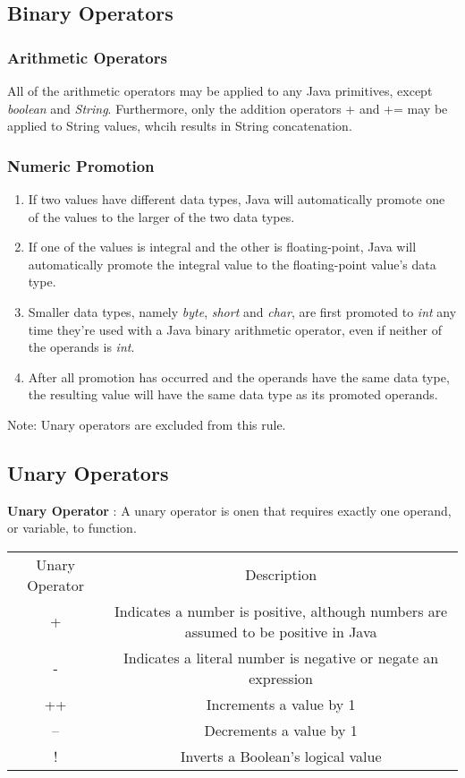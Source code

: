 \documentclass{article}
\begin{document}
\subsection{Binary Operators}
\subsubsection{Arithmetic Operators}
All of the arithmetic operators may be applied to any Java primitives, except \emph{boolean} and \emph{String}. Furthermore, only the addition operators + and += may be applied to String values, whcih results in String concatenation.

\subsubsection{Numeric Promotion}
\begin{enumerate}
	\item If two values have different data types, Java will automatically promote one of the values to the larger of the two data types.
	\item If one of the values is integral and the other is floating-point, Java will automatically promote the integral value to the floating-point value's data type.
	\item Smaller data types, namely \emph{byte}, \emph{short} and \emph{char}, are first promoted to \emph{int} any time they're used with a Java binary arithmetic operator, even if neither of the operands is \emph{int}.
	\item After all promotion has occurred and the operands have the same data type, the resulting value will have the same data type as its promoted operands.
\end{enumerate}

Note: Unary operators are excluded from this rule.

\subsection{Unary Operators} 
\textbf{Unary Operator} : A unary operator is onen that requires exactly one operand, or variable, to function.

\begin{tabular}{|c|c|}
	\cline{1-2}
	Unary Operator & Description \\
	\cline{1-2}
	+ & Indicates a number is positive, although numbers are assumed to be positive in Java \\
	- & Indicates a literal number is negative or negate an expression \\
	++ & Increments a value by 1 \\
	-- & Decrements a value by 1 \\
	! & Inverts a Boolean's logical value \\
	\cline{1-2}
\end{tabular}
\end{document}
